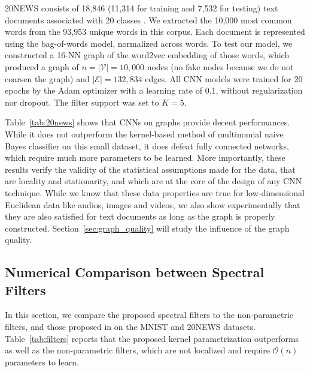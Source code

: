 \documentclass{article}
\newcommand{\V}{\mathcal{V}}
\newcommand{\E}{\mathcal{E}}
\newcommand{\bO}{\mathcal{O}}
\newcommand{\tabref}[1]{Table~\ref{tab:#1}}
\newcommand{\secref}[1]{Section~\ref{sec:#1}}
\newcommand{\bruna}{art:BrunaZarembaSzlamLeCun13DLgraphs,
art:HenaffBrunaLeCun15DLgraphs}
\begin{document}
20NEWS consists of 18,846 (11,314 for training and 7,532 for testing) text
documents associated with 20 classes \cite{art:Joachims9620NEWS}. We extracted
the 10,000 most common words from the 93,953 unique words in this corpus. Each
document is represented using the bag-of-words model, normalized across words.
To test our model, we constructed a 16-NN graph of the word2vec
\cite{pro:MikolovChenCorradoDean13word2vec} embedding of those words, which
produced a graph of $n = |\V| = 10,000$ nodes (no fake nodes because we do not
coarsen the graph) and
$|\E| = 132,834$ edges. All CNN models were trained for 20 epochs by the Adam
optimizer \cite{art:KingmaBa14AdamOpt} with a learning rate of 0.1, without regularization nor
dropout. The filter support was set to $K = 5$.

\tabref{20news} shows that CNNs on graphs provide decent performances. While it does not outperform the kernel-based method of multinomial naive Bayes classifier on this small dataset, it does defeat fully connected networks, which require much more parameters to be learned. More importantly, these results verify the validity of the statistical assumptions made for the data, that are locality and stationarity, and which are at the core of the design of any CNN technique. While we know that these data properties are true for low-dimensional Euclidean data like audios, images and videos, we also show experimentally that they are also satisfied for text documents as long as the graph is properly constructed. \secref{graph_quality} will study the influence of the graph quality. 










\subsection{Numerical Comparison between Spectral Filters}

In this section, we compare the proposed spectral filters to the non-parametric filters, and those proposed in \cite{\bruna} on the MNIST and 20NEWS datasets. \tabref{filters} reports that the proposed kernel parametrization outperforms
\cite{\bruna} as well as the non-parametric filters, which are not localized and require $\bO(n)$ parameters to learn.
\end{document}
